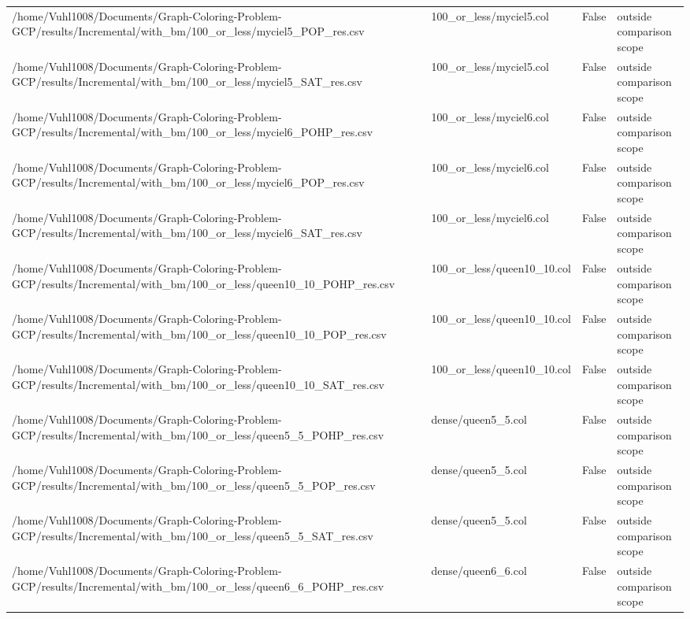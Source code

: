 \begin{table}[htbp]
\begin{tabular}{llll}
/home/Vuhl1008/Documents/Graph-Coloring-Problem-GCP/results/Incremental/with\_bm/100\_or\_less/myciel5\_POP\_res.csv & 100\_or\_less/myciel5.col & False & outside comparison scope \\
/home/Vuhl1008/Documents/Graph-Coloring-Problem-GCP/results/Incremental/with\_bm/100\_or\_less/myciel5\_SAT\_res.csv & 100\_or\_less/myciel5.col & False & outside comparison scope \\
/home/Vuhl1008/Documents/Graph-Coloring-Problem-GCP/results/Incremental/with\_bm/100\_or\_less/myciel6\_POHP\_res.csv & 100\_or\_less/myciel6.col & False & outside comparison scope \\
/home/Vuhl1008/Documents/Graph-Coloring-Problem-GCP/results/Incremental/with\_bm/100\_or\_less/myciel6\_POP\_res.csv & 100\_or\_less/myciel6.col & False & outside comparison scope \\
/home/Vuhl1008/Documents/Graph-Coloring-Problem-GCP/results/Incremental/with\_bm/100\_or\_less/myciel6\_SAT\_res.csv & 100\_or\_less/myciel6.col & False & outside comparison scope \\
/home/Vuhl1008/Documents/Graph-Coloring-Problem-GCP/results/Incremental/with\_bm/100\_or\_less/queen10\_10\_POHP\_res.csv & 100\_or\_less/queen10\_10.col & False & outside comparison scope \\
/home/Vuhl1008/Documents/Graph-Coloring-Problem-GCP/results/Incremental/with\_bm/100\_or\_less/queen10\_10\_POP\_res.csv & 100\_or\_less/queen10\_10.col & False & outside comparison scope \\
/home/Vuhl1008/Documents/Graph-Coloring-Problem-GCP/results/Incremental/with\_bm/100\_or\_less/queen10\_10\_SAT\_res.csv & 100\_or\_less/queen10\_10.col & False & outside comparison scope \\
/home/Vuhl1008/Documents/Graph-Coloring-Problem-GCP/results/Incremental/with\_bm/100\_or\_less/queen5\_5\_POHP\_res.csv & dense/queen5\_5.col & False & outside comparison scope \\
/home/Vuhl1008/Documents/Graph-Coloring-Problem-GCP/results/Incremental/with\_bm/100\_or\_less/queen5\_5\_POP\_res.csv & dense/queen5\_5.col & False & outside comparison scope \\
/home/Vuhl1008/Documents/Graph-Coloring-Problem-GCP/results/Incremental/with\_bm/100\_or\_less/queen5\_5\_SAT\_res.csv & dense/queen5\_5.col & False & outside comparison scope \\
/home/Vuhl1008/Documents/Graph-Coloring-Problem-GCP/results/Incremental/with\_bm/100\_or\_less/queen6\_6\_POHP\_res.csv & dense/queen6\_6.col & False & outside comparison scope \\

\end{tabular}
\end{table}
